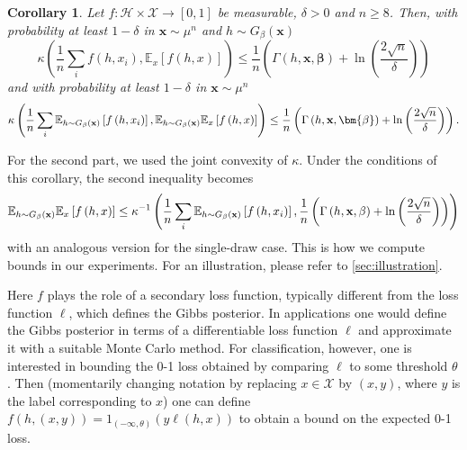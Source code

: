 \documentclass{article} %
\newtheorem{corollary}[theorem]{Corollary}
\begin{document}
\begin{corollary}
\label{Corollary kl}Let $f:\mathcal{H}\times\mathcal{X}\rightarrow [0,1]$ be measurable, $\delta>0$ and $n\geq 8$. Then, with probability
at least $1-\delta$ in $\mathbf{x}\sim \mu ^{n}$ and $h\sim G_{\beta
}(\mathbf{x})$
\begin{equation*}
\kappa \left(\frac{1}{n}\sum_{i}f(h,x_{i}),\mathbb{E}_{x}[f(h,x)]\right) \leq \frac{1}{n}\left(\Gamma(h,\mathbf{x},\bm{\beta})+\ln \left(\frac{2\sqrt{n}}{\delta}\right) \right)
\end{equation*}
and with probability at least $1-\delta $ in $\mathbf{x}\sim \mu ^{n}$%
\begin{equation*}
\kappa \left(\frac{1}{n}\sum_{i}\mathbb{E}_{h\sim G_{\beta }\left( \mathbf{%
x}\right) }\left[ f\left( h,x_{i}\right) \right] ,\mathbb{E}_{h\sim G_{\beta
}\left( \mathbf{x}\right) }\mathbb{E}_{x}\left[ f\left( h,x\right) \right]
\right) \leq \frac{1}{n}\left( \Gamma \left( h,\mathbf{x},\bm{\beta}%
\right) +\ln \left( \frac{2\sqrt{n}}{\delta }\right) \right) .
\end{equation*}
\end{corollary}

For the second part, we used the joint convexity of $\kappa $. Under the
conditions of this corollary, the second inequality becomes%
\begin{equation*}
\mathbb{E}_{h\sim G_{\beta }\left( \mathbf{x}\right) }\mathbb{E}_{x}\left[
f\left( h,x\right) \right] \leq \kappa ^{-1}\left( \frac{1}{n}\sum_{i}%
\mathbb{E}_{h\sim G_{\beta }\left( \mathbf{x}\right) }\left[ f\left(
h,x_{i}\right) \right] ,\frac{1}{n}\left( \Gamma \left( h,\mathbf{x},\mathbf{%
\beta }\right) +\ln \left( \frac{2\sqrt{n}}{\delta }\right) \right) \right)
\end{equation*}%
with an analogous version for the single-draw case. This is how we compute bounds in our experiments. For an illustration, please refer to \ref{sec:illustration}. 

Here $f$ plays the role of a secondary loss function, typically different from the loss function $\ell$, which defines the Gibbs posterior.
In applications one would define the Gibbs posterior in terms of a differentiable loss function $\ell $ and approximate it with a suitable Monte Carlo method. For classification, however, one is interested in bounding the 0-1 loss obtained by comparing $\ell $ to some threshold $\theta$. Then (momentarily changing notation by replacing $x\in \mathcal{X}$
by $\left( x,y\right) $, where $y$ is the label corresponding to $x$) one
can define $f\left( h,\left( x,y\right) \right) =1_{\left( -\infty ,\theta
\right) }\left( y\ell \left( h,x\right) \right) $ to obtain a bound on the
expected 0-1 loss. 
\end{document}
